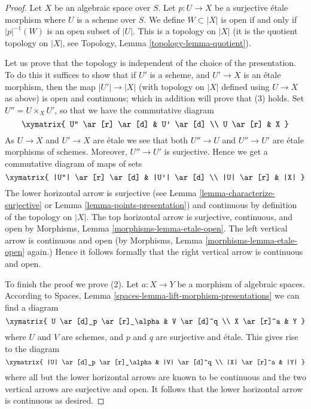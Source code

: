 \begin{proof}
Let $X$ be an algebraic space over $S$. Let $p : U \to X$ be a
surjective \'etale morphism where $U$ is a scheme over $S$.
We define $W \subset |X|$ is open if and only if $|p|^{-1}(W)$
is an open subset of $|U|$. This is a topology on $|X|$
(it is the quotient topology on $|X|$, see
Topology, Lemma \ref{topology-lemma-quotient}).

\medskip\noindent
Let us prove that the topology is independent of the choice of
the presentation. To do this it suffices to show that if $U'$ is a scheme,
and $U' \to X$ is an \'etale morphism, then the map $|U'| \to |X|$
(with topology on $|X|$ defined using $U \to X$ as above)
is open and continuous; which in addition will prove that (3) holds.
Set $U'' = U \times_X U'$, so that we have the commutative diagram
$$
\xymatrix{
U'' \ar[r] \ar[d] & U' \ar[d] \\
U \ar[r] & X
}
$$
As $U \to X$ and $U' \to X$ are \'etale we see that
both $U'' \to U$ and $U'' \to U'$ are \'etale morphisms of schemes.
Moreover, $U'' \to U'$ is surjective. Hence
we get a commutative diagram of maps of sets
$$
\xymatrix{
|U''| \ar[r] \ar[d] & |U'| \ar[d] \\
|U| \ar[r] & |X|
}
$$
The lower horizontal arrow is surjective (see
Lemma \ref{lemma-characterize-surjective}
or
Lemma \ref{lemma-points-presentation})
and continuous by definition of the topology on $|X|$.
The top horizontal arrow is surjective, continuous, and open by
Morphisms, Lemma \ref{morphisms-lemma-etale-open}.
The left vertical arrow is continuous and open (by
Morphisms, Lemma \ref{morphisms-lemma-etale-open}
again.) Hence it follows formally that the right vertical
arrow is continuous and open.

\medskip\noindent
To finish the proof we prove (2).
Let $a : X \to Y$ be a morphism of algebraic spaces. According to
Spaces, Lemma \ref{spaces-lemma-lift-morphism-presentations}
we can find a diagram
$$
\xymatrix{
U \ar[d]_p \ar[r]_\alpha & V \ar[d]^q \\
X \ar[r]^a & Y
}
$$
where $U$ and $V$ are schemes, and $p$ and $q$ are surjective and \'etale.
This gives rise to the diagram
$$
\xymatrix{
|U| \ar[d]_p \ar[r]_\alpha & |V| \ar[d]^q \\
|X| \ar[r]^a & |Y|
}
$$
where all but the lower horizontal arrows are known to be continuous and
the two vertical arrows are surjective and open. It follows that the
lower horizontal arrow is continuous as desired.
\end{proof}

